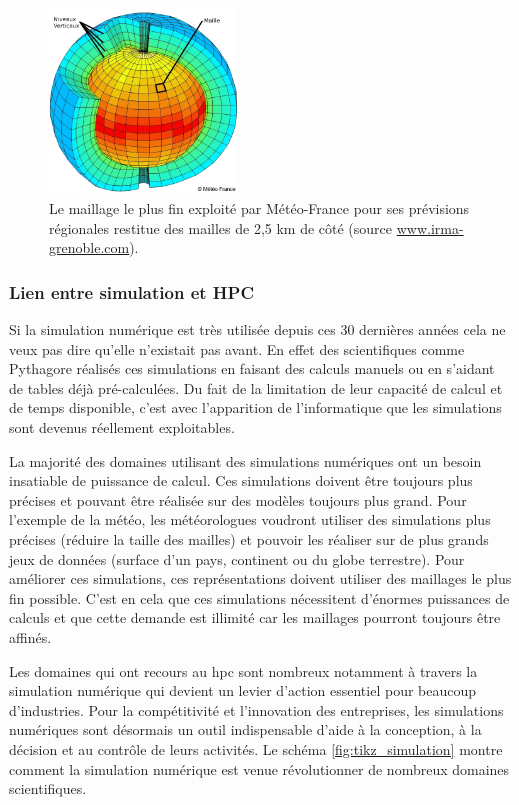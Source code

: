                  
        \begin{figure}
        \center
        \includegraphics[width=5cm]{images/Chapitre1/maillage.png}
        \caption{\label{pic_maillage} Le maillage le plus fin exploité par Météo-France pour ses prévisions régionales restitue des mailles de 2,5 km de côté (source \url{www.irma-grenoble.com}).}
        \end{figure}
      
  
    \subsubsection{Lien entre simulation et HPC}
    
        Si la simulation numérique est très utilisée depuis ces 30 dernières années cela ne veux pas dire qu'elle n'existait pas avant. En effet des scientifiques comme Pythagore réalisés ces simulations en faisant des calculs manuels ou en s'aidant de tables déjà pré-calculées. Du fait de la limitation de leur capacité de calcul et de temps disponible, c'est avec l'apparition de l'informatique que les simulations sont devenus réellement exploitables.

        La majorité des domaines utilisant des simulations numériques ont un besoin insatiable de puissance de calcul. Ces simulations doivent être toujours plus précises et pouvant être réalisée sur des modèles toujours plus grand. Pour l'exemple de la météo, les météorologues voudront utiliser des simulations plus précises (réduire la taille des mailles) et pouvoir les réaliser sur de plus grands jeux de données (surface d'un pays, continent ou du globe terrestre).
        Pour améliorer ces simulations, ces représentations doivent utiliser des maillages le plus fin possible. C'est en cela que ces simulations nécessitent d'énormes puissances de calculs et que cette demande est illimité car les maillages pourront toujours être affinés. 
        
        Les domaines qui ont recours au \gls{hpc} sont nombreux notamment à travers la simulation numérique qui devient un levier d'action essentiel pour beaucoup d'industries. Pour la compétitivité et l'innovation des entreprises, les simulations numériques sont désormais un outil indispensable d'aide à la conception, à la décision et au contrôle de leurs activités. Le schéma \ref{fig:tikz_simulation} montre comment la simulation numérique est venue révolutionner de nombreux domaines scientifiques.



